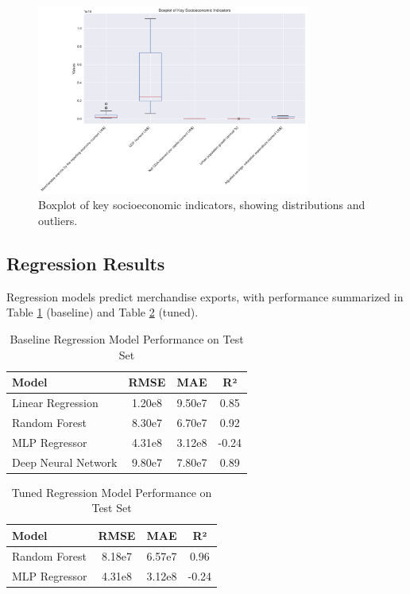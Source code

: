 \documentclass[12pt]{article}
\begin{document}
	\begin{figure}[H]
		\centering
		\includegraphics[width=0.8\textwidth]{../boxplot.png}
		\caption{Boxplot of key socioeconomic indicators, showing distributions and outliers.}
		\label{fig:boxplot}
	\end{figure}
	
	\subsection{Regression Results}
	Regression models predict merchandise exports, with performance summarized in Table \ref{tab:regression_base} (baseline) and Table \ref{tab:regression_tuned} (tuned).
	
	\begin{table}[H]
		\centering
		\caption{Baseline Regression Model Performance on Test Set}
		\begin{tabular}{lccc}
			\toprule
			Model & RMSE & MAE & R² \\
			\midrule
			Linear Regression & 1.20e8 & 9.50e7 & 0.85 \\
			Random Forest & 8.30e7 & 6.70e7 & 0.92 \\
			MLP Regressor & 4.31e8 & 3.12e8 & -0.24 \\
			Deep Neural Network & 9.80e7 & 7.80e7 & 0.89 \\
			\bottomrule
		\end{tabular}
		\label{tab:regression_base}
	\end{table}
	
	\begin{table}[H]
		\centering
		\caption{Tuned Regression Model Performance on Test Set}
		\begin{tabular}{lccc}
			\toprule
			Model & RMSE & MAE & R² \\
			\midrule
			Random Forest & 8.18e7 & 6.57e7 & 0.96 \\
			MLP Regressor & 4.31e8 & 3.12e8 & -0.24 \\
			\bottomrule
		\end{tabular}
		\label{tab:regression_tuned}
	\end{table}
	
\end{document}
